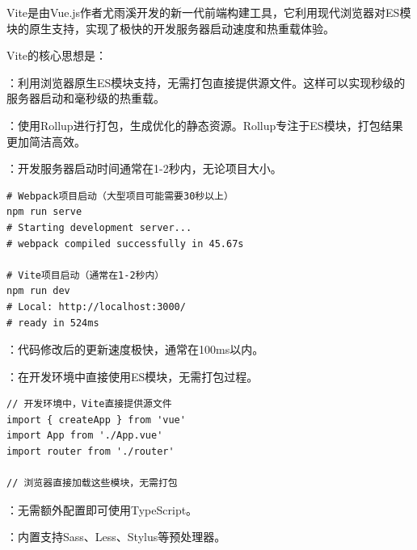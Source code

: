 Vite是由Vue.js作者尤雨溪开发的新一代前端构建工具，它利用现代浏览器对ES模块的原生支持，实现了极快的开发服务器启动速度和热重载体验。


Vite的核心思想是：

：利用浏览器原生ES模块支持，无需打包直接提供源文件。这样可以实现秒级的服务器启动和毫秒级的热重载。

：使用Rollup进行打包，生成优化的静态资源。Rollup专注于ES模块，打包结果更加简洁高效。


：开发服务器启动时间通常在1-2秒内，无论项目大小。

\begin{lstlisting}[style=terminal]
# Webpack项目启动（大型项目可能需要30秒以上）
npm run serve
# Starting development server...
# webpack compiled successfully in 45.67s

# Vite项目启动（通常在1-2秒内）
npm run dev
# Local: http://localhost:3000/
# ready in 524ms
\end{lstlisting}

：代码修改后的更新速度极快，通常在100ms以内。

：在开发环境中直接使用ES模块，无需打包过程。

\begin{lstlisting}[style=javascript]
// 开发环境中，Vite直接提供源文件
import { createApp } from 'vue'
import App from './App.vue'
import router from './router'

// 浏览器直接加载这些模块，无需打包
\end{lstlisting}

：无需额外配置即可使用TypeScript。

：内置支持Sass、Less、Stylus等预处理器。


